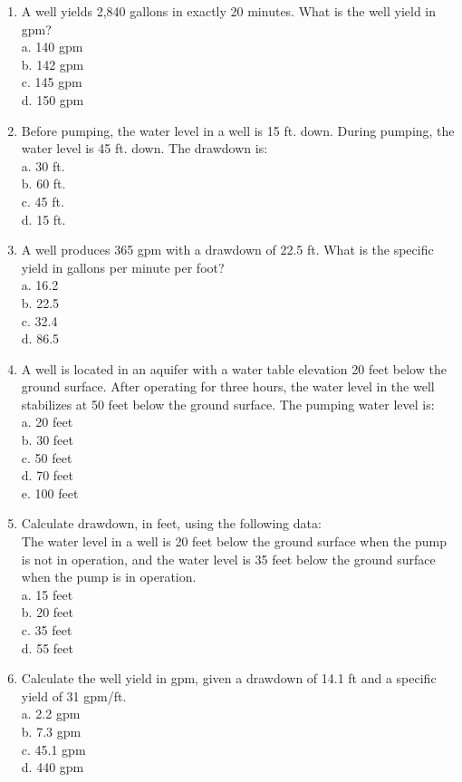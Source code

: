 \documentclass{article}
\begin{document}
\begin{enumerate}
\item A well yields 2,840 gallons in exactly 20 minutes. What is the well yield in gpm?\\
a. 140 gpm\\
b. 142 gpm\\
c. 145 gpm\\
d. 150 gpm

\item Before pumping, the water level in a well is 15 ft. down. During pumping, the water level is 45 ft. down. The drawdown is:\\
a. 30 ft.\\
b. 60 ft.\\
c. 45 ft.\\
d. 15 ft.\\

\item A well produces 365 gpm with a drawdown of 22.5 ft.  What is	the specific yield in gallons per minute per foot?\\
a.	16.2\\
b.	22.5\\
c.	32.4\\
d.	86.5\\

\item A well is located in an aquifer with a water table elevation 20 feet below the ground surface. After operating for three hours, the water level in the well stabilizes at 50 feet below the ground surface. The pumping water level is:\\
a.	20 feet\\
b.  30 feet\\
c.	50 feet\\
d.	70 feet\\
e.	100 feet\\

\item Calculate drawdown, in feet, using the following data:\\
The water level in a well is 20 feet below the ground surface when the pump is not in operation, and the water level is 35 feet below the ground surface when the pump is in operation.\\
a.	15 feet\\
b.	20 feet\\
c.	35 feet\\
d.	55 feet\\

\item Calculate the well yield in gpm, given a drawdown of 14.1 ft and a specific yield of 31
gpm/ft.\\
a. 2.2 gpm\\
b. 7.3 gpm\\
c. 45.1 gpm \\
d. 440 gpm\\


\end{enumerate}
\end{document}
